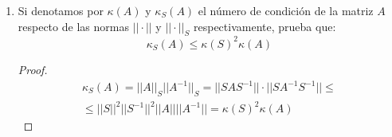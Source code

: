 \begin{ejercicio}
\begin{enumerate}
         \item Si denotamos por $\kappa(A)$ y $\kappa_S(A)$ el número de condición de la matriz $A$ respecto de las normas $||\cdot||$ y $||\cdot||_S$ respectivamente, prueba que:
         $$\kappa_S (A) \leq \kappa(S)^2\kappa(A)$$
         \begin{proof}
             \begin{multline*}
                 \kappa_S(A) = ||A||_S ||A^{-1}||_S = ||SAS^{-1}||\cdot ||SA^{-1}S^{-1}||
                 \leq \\ \leq
                 ||S||^2 ||S^{-1}||^2 ||A||||A^{-1}|| = \kappa(S)^2 \kappa(A)
             \end{multline*}
         \end{proof}
     \end{enumerate}
\end{ejercicio}

